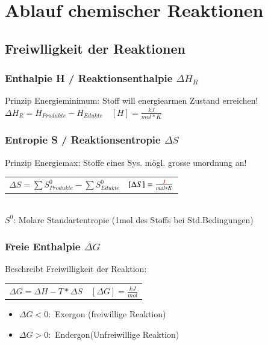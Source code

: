 \section{Ablauf chemischer Reaktionen}

\subsection{Freiwlligkeit der Reaktionen}

\subsubsection{Enthalpie H / Reaktionsenthalpie $\Delta H_R$}
Prinzip Energieminimum: Stoff will energiearmen Zustand erreichen!\\
$\Delta H_R = H_{Produkte} - H_{Edukte} \quad [H] = \frac{kJ}{mol * K}$\\

\subsubsection{Entropie S / Reaktionsentropie $\Delta S$}
Prinzip Energiemax: Stoffe eines Sys. mögl. grosse unordnung an!\\
\begin{tabular}{p{5.5cm}l}
$\Delta S = \sum S^0_{Produkte} - \sum S^0_{Edukte}$ & $[\Delta S] = \frac{\color{red}J}{mol * K}$
\end{tabular}\\
$S^0$: Molare Standartentropie (1mol des Stoffs bei Std.Bedingungen)
\subsubsection{Freie Enthalpie $\Delta G$}
Beschreibt Freiwilligkeit der Reaktion:\\
\begin{tabular}{p{5.5cm}l}
$\Delta G = \Delta H - T * \Delta S$ & $[\Delta G] = \frac{kJ}{mol}$
\end{tabular}
\begin{itemize}
    \item $\Delta G < 0:$ Exergon (freiwillige Reaktion)
    \item $\Delta G > 0:$ Endergon(Unfreiwillige Reaktion)
\end{itemize}

